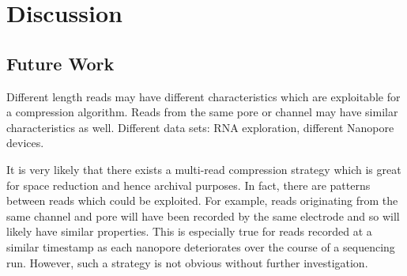 \chapter{Discussion} \label{chap:disc}

\section{Future Work}

Different length reads may have different characteristics which are exploitable for a compression algorithm.
Reads from the same pore or channel may have similar characteristics as well.
Different data sets:
RNA exploration,
different Nanopore devices.

It is very likely that there exists a multi-read compression strategy which is great for space reduction and hence archival purposes.
In fact, there are patterns between reads which could be exploited.
For example, reads originating from the same channel and pore will have been recorded by the same electrode and so will likely have similar properties. This is especially true for reads recorded at a similar timestamp as each nanopore deteriorates over the course of a sequencing run.
However, such a strategy is not obvious without further investigation.

